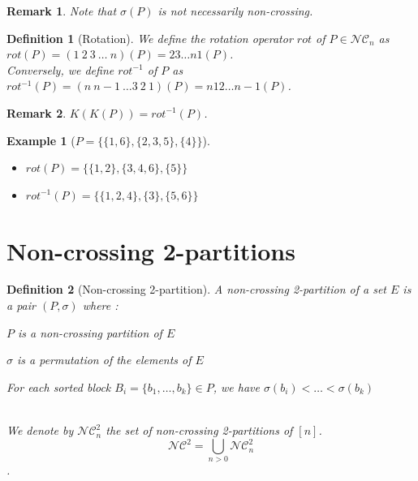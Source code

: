 \documentclass[12pt]{report}
\newtheorem{definition}{Definition}
\newtheorem*{example}{Example}
\newtheorem*{rem}{Remark}
\begin{document}
\begin{rem}
    Note that $\sigma (P)$ is \emph{not} necessarily
    non-crossing.
\end{rem}

\begin{definition}[Rotation]
    We define the \emph{rotation operator} $rot$ of
    $P \in \mathcal{NC}_n$ as $rot (P) = 
    (1\ 2\ 3\  \ldots \ n)(P) = 23 \ldots n1 (P)$.\\
    Conversely, we define $rot^{-1}$ of $P$ as
    $rot^{-1}(P) = (n\ n-1\ \ldots 3\ 2\ 1)(P) = 
    n12 \ldots n-1 (P)$.
\end{definition}

\begin{rem}
    $K (K (P)) = rot^{-1} (P)$.
\end{rem}

\begin{example}[$P = \{\{1, 6\}, \{2, 3, 5\}, \{4\}\}$]
    \text{}
    \begin{itemize}
        \item $rot (P) = \{\{1, 2\}, \{3, 4, 6\}, \{5\}\}$
        \item $rot^{-1}(P) = \{\{1, 2, 4\}, \{3\}, \{5, 6\}\}$
    \end{itemize}
    
\end{example}

\section{Non-crossing 2-partitions}

\begin{definition}[Non-crossing 2-partition]
    A \emph{non-crossing 2-partition} of a set $E$ is a pair $(P, \sigma)$
    where :\\
    \begin{itemize*}
        \item $P$ is a non-crossing partition of $E$\\
        \item $\sigma$ is a permutation of the elements of $E$\\
        \item For each \emph{sorted} block
            $B_i = \{b_1, \ldots, b_k\} \in P$, we have
            $\sigma (b_i) < \ldots < \sigma (b_k)$\\\\
    \end{itemize*}
    We denote by $\mathcal{NC}^2_n$ the set of non-crossing
    2-partitions of $[n]$.
    $$\mathcal{NC}^2 = \bigcup_{n > 0}{\mathcal{NC}^2_n}$$.
\end{definition}
\end{document}
